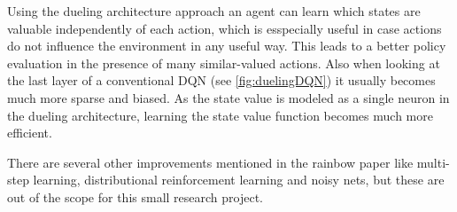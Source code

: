 Using the dueling architecture approach an agent can learn which states are valuable independently of each action, which is esspecially useful in case actions do not influence the environment in any useful way. This leads to a better policy evaluation in the presence of many similar-valued actions. Also when looking at the last layer of a conventional DQN (see \autoref{fig:duelingDQN}) it usually becomes much more sparse and biased. As the state value is modeled as a single neuron in the dueling architecture, learning the state value function becomes much more efficient.


There are several other improvements mentioned in the rainbow paper \cite{Hessel2017} like multi-step learning, distributional reinforcement learning and noisy nets, but these are out of the scope for this small research project. 